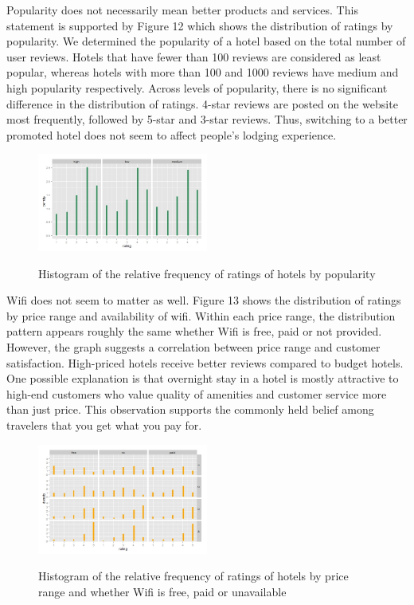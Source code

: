 \documentclass[11pt]{article}
\begin{document}
Popularity does not necessarily mean better products and services. This statement is supported by Figure 12 which shows the distribution of ratings by popularity. We determined the popularity of a hotel based on the total number of user reviews. Hotels that have fewer than 100 reviews are considered as least popular, whereas hotels with more than 100 and 1000 reviews have medium and high popularity respectively. Across levels of popularity, there is no significant difference in the distribution of ratings. 4-star reviews are posted on the website most frequently, followed by 5-star and 3-star reviews. Thus, switching to a better promoted hotel does not seem to affect people’s lodging experience.

\begin{figure}[h!]
           \caption{Histogram of the relative frequency of ratings of hotels by popularity}
	\centering
	\includegraphics[width=0.5\textwidth]{Figures/hotels1.jpeg}
           \label{hotels1}
\end{figure}

Wifi does not seem to matter as well. Figure 13 shows the distribution of ratings by price range and availability of wifi. Within each price range, the distribution pattern appears roughly the same whether Wifi is free, paid or not provided. However, the graph suggests a correlation between price range and customer satisfaction. High-priced hotels receive better reviews compared to budget hotels. One possible explanation is that overnight stay in a hotel is mostly attractive to high-end customers who value quality of amenities and customer service more than just price. This observation supports the commonly held belief among travelers that you get what you pay for.

\begin{figure}[h!]
           \caption{Histogram of the relative frequency of ratings of hotels by price range and whether Wifi is free, paid or unavailable}
	\centering
	\includegraphics[width=0.5\textwidth]{Figures/hotels2.jpeg}
           \label{hotels2}
\end{figure}
\end{document}
